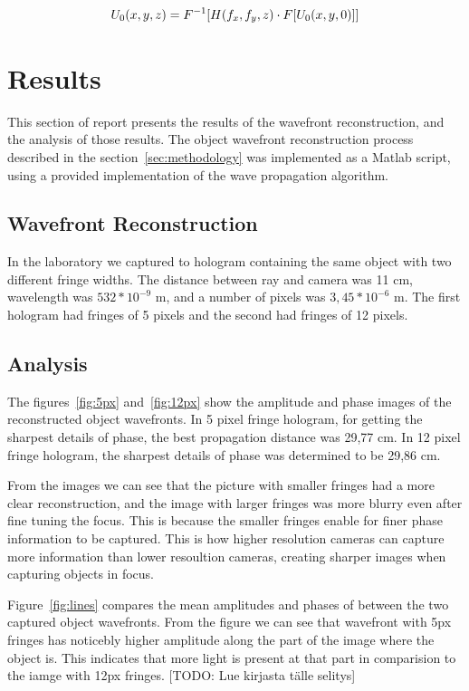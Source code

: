 \documentclass[12pt,a4paper,english
]{tunithesis}
\begin{document}
\begin{align}
U_0(x,y,z) &= F^{-1}[H(f_x,f_y,z) \cdot F[U_0(x,y,0)]] \notag \\
\label{eq:projection}
\end{align}


\chapter{Results}
\label{sec:results}
This section of report presents the results of the wavefront reconstruction, and the analysis of those results.
The object wavefront reconstruction process described in the section~\ref{sec:methodology} was implemented as a Matlab script, using a provided implementation of the wave propagation algorithm. 

\section{Wavefront Reconstruction}
In the laboratory we captured to hologram containing the same object with two different fringe widths. The distance between ray and camera was 11 cm, wavelength was ${532 * 10^{-9}}$ m, and a number of pixels was ${3,45*10^{-6}}$ m. The first hologram had fringes of 5 pixels and the second had fringes of 12 pixels.

\section{Analysis}
The figures~\ref{fig:5px} and~\ref{fig:12px} show the amplitude and phase images of the reconstructed object wavefronts. In 5 pixel fringe hologram, for getting the sharpest details of phase, the best propagation distance was 29,77 cm. In 12 pixel fringe hologram, the sharpest details of phase was determined to be 29,86 cm.

From the images we can see that the picture with smaller fringes had a more clear reconstruction, and the image with larger fringes was more blurry even after fine tuning the focus. This is because the smaller fringes enable for finer phase information to be captured. This is how higher resolution cameras can capture more information than lower resoultion cameras, creating sharper images when capturing objects in focus.

Figure~\ref{fig:lines} compares the mean amplitudes and phases of between the two captured object wavefronts. From the figure we can see that wavefront with 5px fringes has noticebly higher amplitude along the part of the image where the object is. This indicates that more light is present at that part in comparision to the iamge with 12px fringes. [TODO: Lue kirjasta tälle selitys]
\end{document}
